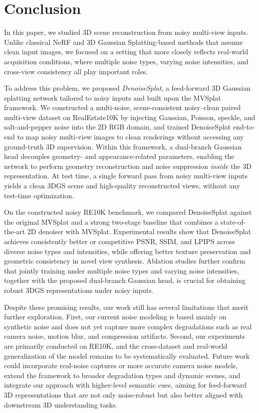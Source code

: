 \section{Conclusion}
\label{sec:conclusion}

In this paper, we studied 3D scene reconstruction from noisy multi-view inputs. Unlike classical NeRF and 3D Gaussian Splatting-based methods that assume clean input images, we focused on a setting that more closely reflects real-world acquisition conditions, where multiple noise types, varying noise intensities, and cross-view consistency all play important roles.

To address this problem, we proposed \emph{DenoiseSplat}, a feed-forward 3D Gaussian splatting network tailored to noisy inputs and built upon the MVSplat framework. We constructed a multi-noise, scene-consistent noisy--clean paired multi-view dataset on RealEstate10K by injecting Gaussian, Poisson, speckle, and salt-and-pepper noise into the 2D RGB domain, and trained DenoiseSplat end-to-end to map noisy multi-view images to clean renderings without accessing any ground-truth 3D supervision. Within this framework, a dual-branch Gaussian head decouples geometry- and appearance-related parameters, enabling the network to perform geometry reconstruction and noise suppression \emph{inside} the 3D representation. At test time, a single forward pass from noisy multi-view inputs yields a clean 3DGS scene and high-quality reconstructed views, without any test-time optimization.

On the constructed noisy RE10K benchmark, we compared DenoiseSplat against the original MVSplat and a strong two-stage baseline that combines a state-of-the-art 2D denoiser with MVSplat. Experimental results show that DenoiseSplat achieves consistently better or competitive PSNR, SSIM, and LPIPS across diverse noise types and intensities, while offering better texture preservation and geometric consistency in novel view synthesis. Ablation studies further confirm that jointly training under multiple noise types and varying noise intensities, together with the proposed dual-branch Gaussian head, is crucial for obtaining robust 3DGS representations under noisy inputs.

Despite these promising results, our work still has several limitations that merit further exploration. First, our current noise modeling is based mainly on synthetic noise and does not yet capture more complex degradations such as real camera noise, motion blur, and compression artifacts. Second, our experiments are primarily conducted on RE10K, and the cross-dataset and real-world generalization of the model remains to be systematically evaluated. Future work could incorporate real-noise captures or more accurate camera noise models, extend the framework to broader degradation types and dynamic scenes, and integrate our approach with higher-level semantic cues, aiming for feed-forward 3D representations that are not only noise-robust but also better aligned with downstream 3D understanding tasks.



